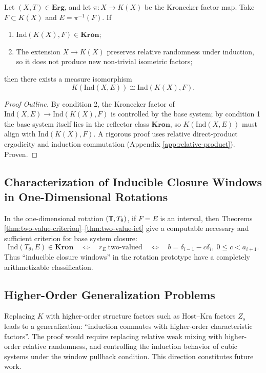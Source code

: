 \begin{theorem}\label{thm:reflector-induction-template}
Let $(X,T)\in\mathbf{Erg}$, and let $\pi:X\to K(X)$ be the Kronecker factor map. Take $F\subset K(X)$ and $E=\pi^{-1}(F)$. If
\begin{enumerate}
  \item $\mathrm{Ind}(K(X),F)\in\mathbf{Kron}$;
  \item The extension $X\to K(X)$ preserves relative randomness under induction, so it does not produce new non-trivial isometric factors;
\end{enumerate}
then there exists a measure isomorphism
\[
K(\mathrm{Ind}(X,E))\cong \mathrm{Ind}(K(X),F).
\]
\end{theorem}

\begin{proof}[Proof Outline]
By condition 2, the Kronecker factor of $\mathrm{Ind}(X,E)\to \mathrm{Ind}(K(X),F)$ is controlled by the base system; by condition 1 the base system itself lies in the reflector class $\mathbf{Kron}$, so $K(\mathrm{Ind}(X,E))$ must align with $\mathrm{Ind}(K(X),F)$. A rigorous proof uses relative direct-product ergodicity and induction commutation (Appendix \ref{app:relative-product}). Proven.
\end{proof}

\subsection{Characterization of Inducible Closure Windows in One-Dimensional Rotations}

In the one-dimensional rotation $(\mathbb{T},T_\theta)$, if $F=E$ is an interval, then Theorems \ref{thm:two-value-criterion}--\ref{thm:two-value-iet} give a computable necessary and sufficient criterion for base system closure:
\[
\mathrm{Ind}(T_\theta,E)\in\mathbf{Kron}
\quad\Longleftrightarrow\quad
r_E\ \text{two-valued}
\quad\Longleftrightarrow\quad
b=\delta_{i-1}-c\delta_i,\ 0\le c<a_{i+1}.
\]
Thus ``inducible closure windows'' in the rotation prototype have a completely arithmetizable classification.

\subsection{Higher-Order Generalization Problems}

Replacing $K$ with higher-order structure factors such as Host--Kra factors $Z_s$ leads to a generalization: ``induction commutes with higher-order characteristic factors''. The proof would require replacing relative weak mixing with higher-order relative randomness, and controlling the induction behavior of cubic systems under the window pullback condition. This direction constitutes future work.
